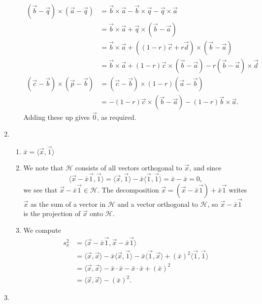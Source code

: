 \begin{enumerate}
\begin{enumerate}
\begin{align*}
(\vec{b} - \vec{q})\times (\vec{a} - \vec{q}) &= \vec{b}\times\vec{a} - \vec{b}\times\vec{q} - \vec{q}\times\vec{a} \\
&= \vec{b}\times\vec{a} + \vec{q}\times (\vec{b} - \vec{a}) \\
&= \vec{b}\times\vec{a} + ((1 - r)\vec{c} + r\vec{d})\times (\vec{b} - \vec{a}) \\
&= \vec{b}\times\vec{a} + (1 - r)\vec{c}\times (\vec{b} - \vec{a}) - r(\vec{b} - \vec{a})\times\vec{d} \\
(\vec{c} - \vec{b})\times (\vec{p} - \vec{b}) &= (\vec{c} - \vec{b})\times (1 - r)(\vec{a} - \vec{b}) \\
&= -(1 - r)\vec{c}\times (\vec{b} - \vec{a}) - (1 - r)\vec{b}\times\vec{a}.
\end{align*}
Adding these up gives $\vec{0}$, as required.
\end{enumerate}
\item \begin{enumerate}
\item $\bar{x} = \langle\vec{x},\vec{1}\rangle$
\item We note that $\mathcal{H}$ consists of all vectors orthogonal to $\vec{x}$, and since
\begin{equation*}
\langle\vec{x} - \bar{x}\vec{1},\vec{1}\rangle = \langle\vec{x},\vec{1}\rangle - \bar{x}\langle\vec{1},\vec{1}\rangle = \bar{x} - \bar{x} = 0,
\end{equation*}
we see that $\vec{x} - \bar{x}\vec{1}\in\mathcal{H}$. The decomposition $\vec{x} = (\vec{x} - \bar{x}\vec{1}) + \bar{x}\vec{1}$ writes $\vec{x}$ as the sum of a vector in $\mathcal{H}$ and a vector orthogonal to $\mathcal{H}$, so $\vec{x} - \bar{x}\vec{1}$ is the projection of $\vec{x}$ onto $\mathcal{H}$.
\item We compute
\begin{align*}
s_x^2 &= \langle\vec{x} - \bar{x}\vec{1}, \vec{x} - \bar{x}\vec{1}\rangle \\
&= \langle\vec{x},\vec{x}\rangle - \bar{x}\langle\vec{x},\vec{1}\rangle - \bar{x}\langle\vec{1},\vec{x}\rangle + (\bar{x})^2\langle\vec{1},\vec{1}\rangle \\
&= \langle\vec{x},\vec{x}\rangle - \bar{x}\cdot\bar{x} - \bar{x}\cdot\bar{x} + (\bar{x})^2 \\
&= \langle\vec{x},\vec{x}\rangle - (\bar{x})^2.
\end{align*}
\end{enumerate}
\newpage
\item \begin{enumerate}

\end{enumerate}
\end{enumerate}
